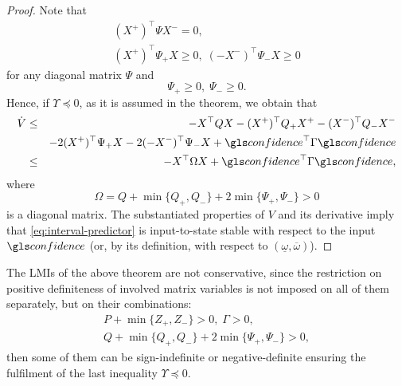 \begin{proof}
	Note that
	\begin{gather*}
	(X^{+})^{\top}\Psi X^{-}=0,\\
	(X^{+})^{\top}\Psi_{+}X\geq0,\;(-X^{-})^{\top}\Psi_{-}X\geq0
	\end{gather*}
	for any diagonal matrix $\Psi$ and
	\[
	\Psi_{+}\geq0,\;\Psi_{-}\geq0.
	\]
	Hence, if $\Upsilon\preceq0$, as it is assumed in the theorem, we obtain that
	\begin{eqnarray*}
		\dot{V} & \leq & -X^{\top}QX-(X^{+})^{\top}Q_{+}X^{+}-(X^{-})^{\top}Q_{-}X^{-}\\
		&  & -2(X^{+})^{\top}\Psi_{+}X-2(-X^{-})^{\top}\Psi_{-}X+\confidence^{\top}\Gamma\confidence\\
		& \leq & -X^{\top}\Omega X+\confidence^{\top}\Gamma\confidence,
	\end{eqnarray*}
	where
	\[
	\Omega=Q+\min\{Q_{+},Q_{-}\}+2\min\{\Psi_{+},\Psi_{-}\}>0
	\]
	is a diagonal matrix. The substantiated properties of $V$ and its derivative imply that \eqref{eq:interval-predictor} is input-to-state stable \citep{Khalil2002} with respect to the input $\confidence$ (or, by its definition, with respect to $(\underline{\omega},\overline{\omega})$).
\end{proof}
\begin{remark}
	\begin{leftbar}[remarkbar]
	The \glspl{LMI} of the above theorem are not conservative, since the restriction on positive definiteness of involved matrix variables is not imposed on all of them separately, but on their combinations:
	\begin{gather*}
	P+\min\{Z_{+},Z_{-}\}>0,\;\Gamma>0,\\
	Q+\min\{Q_{+},Q_{-}\}+2\min\{\Psi_{+},\Psi_{-}\}>0,
	\end{gather*}
	then some of them can be sign-indefinite or negative-definite ensuring the fulfilment of the last inequality
	$
	\Upsilon\preceq0.
	$
	\end{leftbar}
\end{remark}

